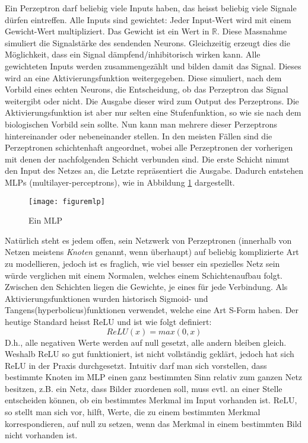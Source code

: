 \documentclass[12pt,a4paper]{article}
\begin{document}
Ein Perzeptron darf beliebig viele Inputs haben, das heisst beliebig viele Signale dürfen eintreffen. 
Alle Inputs sind gewichtet: Jeder Input-Wert wird mit einem Gewicht-Wert multipliziert. Das Gewicht ist ein Wert in $\mathbb{R}$. Diese Massnahme simuliert die Signalstärke des sendenden Neurons. Gleichzeitig erzeugt dies die Möglichkeit, dass ein Signal dämpfend/inhibitorisch wirken kann.
Alle gewichteten Inputs werden zusammengezählt und bilden damit das Signal. Dieses wird an eine Aktivierungsfunktion weitergegeben. Diese simuliert, nach dem Vorbild eines echten Neurons, die Entscheidung, ob das Perzeptron das Signal weitergibt oder nicht. Die Ausgabe dieser wird zum Output des Perzeptrons. Die Aktivierungsfunktion ist aber nur selten eine Stufenfunktion, so wie sie nach dem biologischen Vorbild sein sollte.
Nun kann man mehrere dieser Perzeptrons hintereinander oder nebeneinander stellen. In den meisten Fällen sind die Perzeptronen schichtenhaft angeordnet, wobei alle Perzeptronen der vorherigen mit denen der nachfolgenden Schicht verbunden sind. Die erste Schicht nimmt den Input des Netzes an, die Letzte repräsentiert die Ausgabe. Dadurch entstehen MLPs (multilayer-perceptrons), wie in Abbildung \ref{fig:MLP} dargestellt.
\begin{figure}
\centering
\texttt{[image: figuremlp]}
\caption{ Ein MLP\cite{figuremlp}}
\label{fig:MLP}
\end{figure}
Natürlich steht es jedem offen, sein Netzwerk von Perzeptronen (innerhalb von Netzen meistens \textit{Knoten} genannt, wenn überhaupt) auf beliebig komplizierte Art zu modellieren, jedoch ist es fraglich, wie viel besser ein spezielles Netz sein würde verglichen mit einem Normalen, welches einem Schichtenaufbau folgt.
Zwischen den Schichten liegen die Gewichte, je eines für jede Verbindung. 
Als Aktivierungsfunktionen wurden historisch Sigmoid- und Tangens(hyperbolicus)funktionen verwendet\cite{video6}, welche eine Art S-Form haben. Der heutige Standard heisst ReLU und ist wie folgt definiert:
	$$ReLU(x) = max(0,x)$$
D.h., alle negativen Werte werden auf null gesetzt, alle andern bleiben gleich. Weshalb ReLU so gut funktioniert, ist nicht vollständig geklärt, jedoch hat sich ReLU in der Praxis durchgesetzt. Intuitiv darf man sich vorstellen, dass bestimmte Knoten im MLP einen ganz bestimmten Sinn relativ zum ganzen Netz besitzen, z.B. ein Netz, dass Bilder zuordenen soll, muss evtl. an einer Stelle entscheiden können, ob ein bestimmtes Merkmal im Input vorhanden ist. ReLU, so stellt man sich vor, hilft, Werte, die zu einem bestimmten Merkmal korrespondieren, auf null zu setzen, wenn das Merkmal in einem bestimmten Bild nicht vorhanden ist\cite{reluexpl}.
\end{document}
